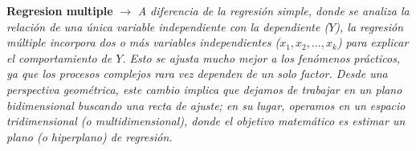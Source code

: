 \documentclass[10pt,a4paper]{article}
\begin{document}
\textbf{Regresion multiple} $\longrightarrow$ \textit{A diferencia de la regresión simple, donde se analiza la relación de una única variable independiente con la dependiente ($Y$), la regresión múltiple incorpora dos o más variables independientes ($x_1, x_2, \ldots, x_k$) para explicar el comportamiento de $Y$. Esto se ajusta mucho mejor a los fenómenos prácticos, ya que los procesos complejos rara vez dependen de un solo factor. Desde una perspectiva geométrica, este cambio implica que dejamos de trabajar en un plano bidimensional buscando una recta de ajuste; en su lugar, operamos en un espacio tridimensional (o multidimensional), donde el objetivo matemático es estimar un plano (o hiperplano) de regresión.}
\end{document}
